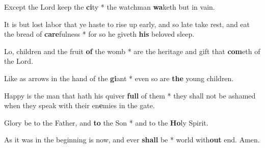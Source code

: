 \begin{multicols}{2}
	Except the Lord keep the \textbf{ci}ty * the watchman \textbf{wa}keth but in vain.

	It is but lost labor that ye haste to rise up early, and so late take rest, and eat the bread of \textbf{care}fulness * for so he giveth \textbf{his} beloved sleep.
	
	Lo, children and the fruit \textbf{of} the womb * are the heritage and gift that \textbf{com}eth of the Lord.
	
	Like as arrows in the hand of the \textbf{gi}ant * even so are \textbf{the} young children.
	
	Happy is the man that hath his quiver \textbf{full} of them * they shall not be ashamed when they speak with their en\textbf{e}mies in the gate.
	
	Glory be to the Father, and \textbf{to} the Son * and to the \textbf{Ho}ly Spirit.
	
	As it was in the beginning is now, and ever \textbf{shall} be * world with\textbf{out} end. Amen.
\end{multicols}